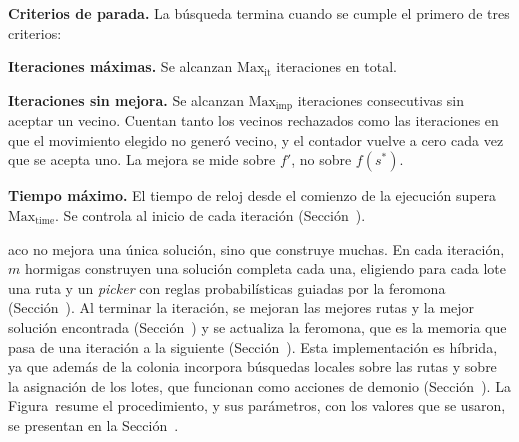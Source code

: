 {\bf Criterios de parada.} La búsqueda termina cuando se cumple el primero
de tres criterios:
\startitemize
	\item {\bf Iteraciones máximas.} Se alcanzan $\text{Max}_{\text{it}}$
	iteraciones en total.
	\item {\bf Iteraciones sin mejora.} Se alcanzan
	$\text{Max}_{\text{imp}}$ iteraciones consecutivas sin aceptar un
	vecino. Cuentan tanto los vecinos rechazados como las iteraciones en que
	el movimiento elegido no generó vecino, y el contador vuelve a cero cada
	vez que se acepta uno. La mejora se mide sobre $f'$, no sobre $f(s^*)$.
	\item {\bf Tiempo máximo.} El tiempo de reloj desde el comienzo de la
	ejecución supera $\text{Max}_{\text{time}}$. Se controla al inicio de
	cada iteración (Sección~).
\stopitemize

\stopsubsection

\stopsection

\startsection[title={Ant Colony Optimization}, reference=sec:aco]

\ac{aco} no mejora una única solución, sino que construye muchas. En cada
iteración, $m$ hormigas construyen una solución completa cada una, eligiendo
para cada lote una ruta y un {\em picker} con reglas probabilísticas guiadas
por la feromona (Sección~). Al terminar la
iteración, se mejoran las mejores rutas y la mejor solución encontrada
(Sección~) y se actualiza la feromona, que es la memoria
que pasa de una iteración a la siguiente (Sección~).
Esta implementación es híbrida, ya que además de la colonia incorpora
búsquedas locales sobre las rutas y sobre la asignación de los lotes, que
funcionan como acciones de demonio (Sección~). La
Figura~ resume el procedimiento, y sus parámetros,
con los valores que se usaron, se presentan en la Sección~.


